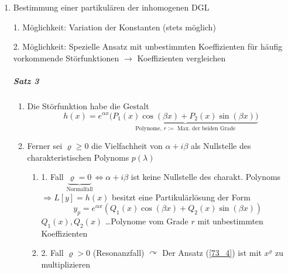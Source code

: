 \documentclass[a4paper]{scrartcl}
\begin{document}
\begin{enumerate}
\begin{enumerate}
\[ \begin{array}{l|c}
\text{Lösungen } \lambda_k \text{ der char. Gl} & \text{FS} \\ \hline
\lambda_1 = 0, \lambda_2 =2, \lambda_3 = -1 & \{ \underbrace{1}_{e^{0x}}, e^{2x}, e^{-x} \} \\
\lambda_{1,2} = 0, \lambda_{3,4,5} = 3 & \{1,x,e^{3x},xe^{3x}, x^2 e^{3x} \} \\
\lambda_{1,2} = 2 \pm 3i & \{ e^{2x} \cos{(3x)}, e^{2x} \sin{(3x)} \} \\
\lambda_{1,2} = \pm i , \lambda_{3,4} = \pm i & \{ \cos{x}, \sin{x}, x \cos{x}, x \sin{x} \} \\

\end{array} \]

\item $\lambda_{1,2} = \alpha \pm i \beta \curvearrowright y_h = c_1 e^{(\alpha + i \beta)x} + c_2 e^{(\alpha - i \beta)x} = c_1 e^{\alpha x} ( \cos{(\beta x)} + i \sin{(\beta x)}) + c_2 e^{\alpha x} (\cos{(\beta x)} - i \sin{(\beta x)} ) = \underbrace{(c_1 +c_2)}_{c_1^*} e^{\alpha x} \cos{(\beta x)} + \underbrace{(c_1-c_2)}_{c_2^*} i e^{\alpha x} \sin{(\beta x)}$

\end{enumerate}

\item Bestimmung einer partikulären der inhomogenen DGL

1. Möglichkeit: Variation der Konstanten (stets möglich)

2. Möglichkeit: Spezielle Ansatz mit unbestimmten Koeffizienten für häufig vorkommende Störfunktionen $\rightarrow$ Koeffizienten vergleichen

\subparagraph{Satz 3}
\begin{enumerate}
\item Die Störfunktion habe die Gestalt 
\[ h(x) = e^{\alpha x} (\underbrace{ P_1(x) \cos{(\beta x)} + P_2 (x) \sin{(\beta x)})}_{\text{Polynome, } r:= \text{ Max. der beiden Grade}} \]

\item Ferner sei $\varrho  \geq 0$ die Vielfachheit von $\alpha + i \beta$ als Nullstelle des charakteristischen Polynoms $p(\lambda)$
\begin{enumerate}
\item 1. Fall $\underbrace{\varrho = 0}_{\text{Normalfall}} \Leftrightarrow \alpha + i \beta$ ist keine Nullstelle des charakt. Polynoms\\
$\Rightarrow L[y] = h(x)$ besitzt eine Partikulärlösung der Form
\begin{equation}\label{73_4} y_p = e^{\alpha x} (Q_1 (x) \cos{(\beta x)} + Q_2 (x) \sin{(\beta x)} )\end{equation}
$Q_1(x),Q_2(x)$ \dots Polynome vom Grade $r$ mit unbestimmten Koeffizienten
\item 2. Fall $\varrho > 0 $ (Resonanzfall) $\curvearrowright$ Der Ansatz (\ref{73_4}) ist mit $x^\varrho$ zu multiplizieren
\end{enumerate}
\end{enumerate}


\end{enumerate}
\end{document}
